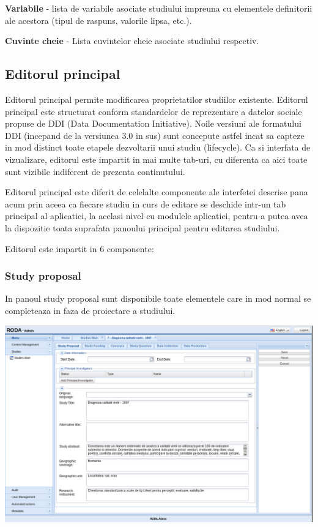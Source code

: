 \textbf{Variabile} - lista de variabile asociate studiului impreuna cu elementele definitorii ale acestora (tipul de raspuns, valorile lipsa, etc.). 

\textbf{Cuvinte cheie} - Lista cuvintelor cheie asociate studiului respectiv. 


\subsection{Editorul principal}

Editorul principal permite modificarea proprietatilor studiilor existente. Editorul principal este structurat conform standardelor de reprezentare a datelor sociale propuse de DDI (Data Documentation Initiative). Noile versiuni ale formatului DDI (incepand de la versiunea 3.0 in sus) sunt concepute astfel incat sa capteze in mod distinct toate etapele dezvoltarii unui studiu (lifecycle). Ca si interfata de vizualizare, editorul este impartit in mai multe tab-uri, cu diferenta ca aici toate sunt vizibile indiferent de prezenta continutului. 

Editorul principal este diferit de celelalte componente ale interfetei descrise pana acum prin aceea ca fiecare studiu in curs de editare se deschide intr-un tab principal al aplicatiei, la acelasi nivel cu modulele aplicatiei, pentru a putea avea la dispozitie toata suprafata panoului principal pentru editarea studiului. 

Editorul este impartit in 6 componente:

\subsubsection{Study proposal}

In panoul study proposal sunt disponibile toate elementele care in mod normal se completeaza in faza de proiectare a studiului. 

\includegraphics[width=16cm]{img/studyedit-proposal}


